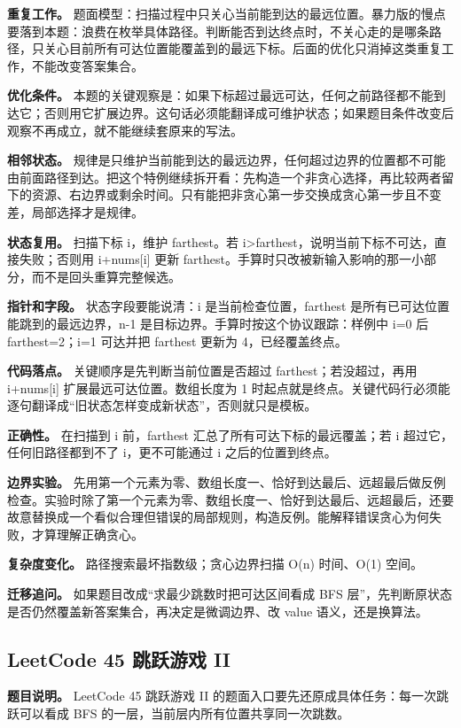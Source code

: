 \textbf{重复工作。} 题面模型：扫描过程中只关心当前能到达的最远位置。暴力版的慢点要落到本题：浪费在枚举具体路径。判断能否到达终点时，不关心走的是哪条路径，只关心目前所有可达位置能覆盖到的最远下标。后面的优化只消掉这类重复工作，不能改变答案集合。

\textbf{优化条件。} 本题的关键观察是：如果下标超过最远可达，任何之前路径都不能到达它；否则用它扩展边界。这句话必须能翻译成可维护状态；如果题目条件改变后观察不再成立，就不能继续套原来的写法。

\textbf{相邻状态。} 规律是只维护当前能到达的最远边界，任何超过边界的位置都不可能由前面路径到达。把这个特例继续拆开看：先构造一个非贪心选择，再比较两者留下的资源、右边界或剩余时间。只有能把非贪心第一步交换成贪心第一步且不变差，局部选择才是规律。

\textbf{状态复用。} 扫描下标 i，维护 farthest。若 i>farthest，说明当前下标不可达，直接失败；否则用 i+nums[i] 更新 farthest。手算时只改被新输入影响的那一小部分，而不是回头重算完整候选。

\textbf{指针和字段。} 状态字段要能说清：i 是当前检查位置，farthest 是所有已可达位置能跳到的最远边界，n-1 是目标边界。手算时按这个协议跟踪：样例中 i=0 后 farthest=2；i=1 可达并把 farthest 更新为 4，已经覆盖终点。

\textbf{代码落点。} 关键顺序是先判断当前位置是否超过 farthest；若没超过，再用 i+nums[i] 扩展最远可达位置。数组长度为 1 时起点就是终点。关键代码行必须能逐句翻译成“旧状态怎样变成新状态”，否则就只是模板。

\textbf{正确性。} 在扫描到 i 前，farthest 汇总了所有可达下标的最远覆盖；若 i 超过它，任何旧路径都到不了 i，更不可能通过 i 之后的位置到终点。

\textbf{边界实验。} 先用第一个元素为零、数组长度一、恰好到达最后、远超最后做反例检查。实验时除了第一个元素为零、数组长度一、恰好到达最后、远超最后，还要故意替换成一个看似合理但错误的局部规则，构造反例。能解释错误贪心为何失败，才算理解正确贪心。

\textbf{复杂度变化。} 路径搜索最坏指数级；贪心边界扫描 O(n) 时间、O(1) 空间。

\textbf{迁移追问。} 如果题目改成“求最少跳数时把可达区间看成 BFS 层”，先判断原状态是否仍然覆盖新答案集合，再决定是微调边界、改 value 语义，还是换算法。

\subsection{LeetCode 45 跳跃游戏 II}

\textbf{题目说明。} LeetCode 45 跳跃游戏 II 的题面入口要先还原成具体任务：每一次跳跃可以看成 BFS 的一层，当前层内所有位置共享同一次跳数。

